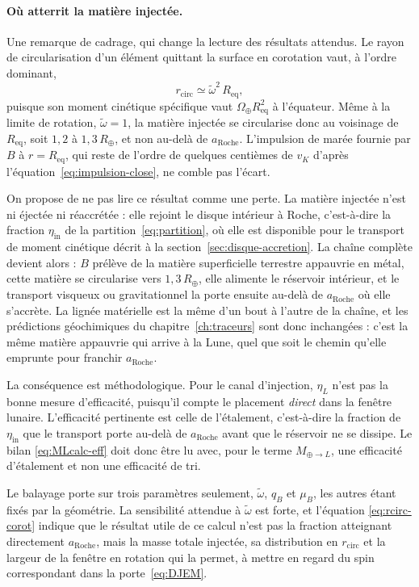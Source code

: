 \documentclass[11pt,a4paper,openany]{report}
\newcommand{\Rt}{R_{\oplus}}
\newcommand{\Req}{R_{\mathrm{eq}}}
\newcommand{\aR}{a_{\mathrm{Roche}}}
\begin{document}
\paragraph{Où atterrit la matière injectée.} Une remarque de cadrage, qui change la lecture des
résultats attendus. Le rayon de circularisation d'un élément quittant la surface en corotation
vaut, à l'ordre dominant,
\begin{equation}
r_{\mathrm{circ}}\simeq\tilde\omega^2\,\Req,
\label{eq:rcirc-corot}
\end{equation}
puisque son moment cinétique spécifique vaut $\Omega_\oplus\Req^2$ à l'équateur. Même à la limite
de rotation, $\tilde\omega=1$, la matière injectée se circularise donc au voisinage de $\Req$, soit
$1{,}2$ à $1{,}3\,\Rt$, et non au-delà de $\aR$. L'impulsion de marée fournie par $B$ à $r=\Req$,
qui reste de l'ordre de quelques centièmes de $v_K$ d'après l'équation~\eqref{eq:impulsion-close},
ne comble pas l'écart.

On propose de ne pas lire ce résultat comme une perte. La matière injectée n'est ni éjectée ni
réaccrétée : elle rejoint le disque intérieur à Roche, c'est-à-dire la fraction
$\eta_{\mathrm{in}}$ de la partition~\eqref{eq:partition}, où elle est disponible pour le transport
de moment cinétique décrit à la section~\ref{sec:disque-accretion}. La chaîne complète devient
alors : $B$ prélève de la matière superficielle terrestre appauvrie en métal, cette matière se
circularise vers $1{,}3\,\Rt$, elle alimente le réservoir intérieur, et le transport visqueux ou
gravitationnel la porte ensuite au-delà de $\aR$ où elle s'accrète. La lignée matérielle est la
même d'un bout à l'autre de la chaîne, et les prédictions géochimiques du
chapitre~\ref{ch:traceurs} sont donc inchangées : c'est la même matière appauvrie qui arrive à la
Lune, quel que soit le chemin qu'elle emprunte pour franchir $\aR$.

La conséquence est méthodologique. Pour le canal d'injection, $\eta_L$ n'est pas la bonne mesure
d'efficacité, puisqu'il compte le placement \emph{direct} dans la fenêtre lunaire. L'efficacité
pertinente est celle de l'étalement, c'est-à-dire la fraction de $\eta_{\mathrm{in}}$ que le
transport porte au-delà de $\aR$ avant que le réservoir ne se dissipe. Le bilan
\eqref{eq:MLcalc-eff} doit donc être lu avec, pour le terme $M_{\oplus\to L}$, une efficacité
d'étalement et non une efficacité de tri.

\begin{controle}
Le balayage porte sur trois paramètres seulement, $\tilde\omega$, $q_B$ et $\mu_B$, les autres étant
fixés par la géométrie. La sensibilité attendue à $\tilde\omega$ est forte, et l'équation
\eqref{eq:rcirc-corot} indique que le résultat utile de ce calcul n'est pas la fraction atteignant
directement $\aR$, mais la masse totale injectée, sa distribution en $r_{\mathrm{circ}}$ et la
largeur de la fenêtre en rotation qui la permet, à mettre en regard du spin correspondant dans la
porte~\eqref{eq:DJEM}.
\end{controle}
\end{document}
